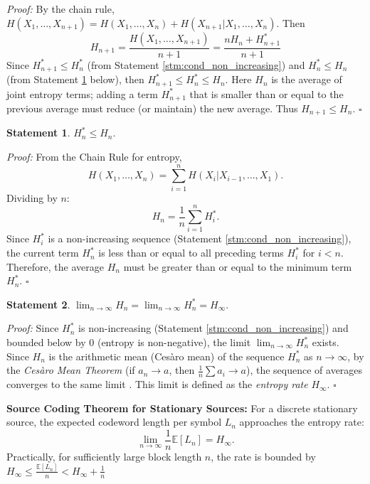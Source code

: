 \documentclass[11pt,a4paper]{article}
\theoremstyle{definition} %
\newtheorem{statement}{Statement}
\newcommand{\E}{\mathbb{E}}
\newcommand{\Hrate}{H_\infty}
\begin{document}
\textit{Proof:} By the chain rule, $H(X_1, \dots, X_{n+1}) = H(X_1, \dots, X_n) + H(X_{n+1} | X_1, \dots, X_n)$. Then
\begin{equation}
    H_{n+1} = \frac{H(X_1, \dots, X_{n+1})}{n+1} = \frac{n H_n + H_{n+1}^*}{n+1}
\end{equation}
Since $H_{n+1}^* \le H_n^*$ (from Statement \ref{stm:cond_non_increasing}) and $H_n^* \le H_n$ (from Statement \ref{stm:bound_relation} below), then $H_{n+1}^* \le H_n^* \le H_n$. Here $H_n$ is the average of joint entropy terms; adding a term $H_{n+1}^*$ that is smaller than or equal to the previous average must reduce (or maintain) the new average. Thus $H_{n+1} \le H_n$. $\square$

\begin{statement} \label{stm:bound_relation}
    $H_n^* \le H_n$.
\end{statement}

\textit{Proof:} From the Chain Rule for entropy,
\begin{equation}
    H(X_1, \dots, X_n) = \sum_{i=1}^n H(X_i | X_{i-1}, \dots, X_1).
\end{equation}
Dividing by $n$:
\begin{equation}
    H_n = \frac{1}{n} \sum_{i=1}^n H_i^*.
\end{equation}
Since $H_i^*$ is a non-increasing sequence (Statement \ref{stm:cond_non_increasing}), the current term $H_n^*$ is less than or equal to all preceding terms $H_i^*$ for $i < n$. Therefore, the average $H_n$ must be greater than or equal to the minimum term $H_n^*$. $\square$

\begin{statement} \label{stm:convergence}
    $\lim_{n \to \infty} H_n = \lim_{n \to \infty} H_n^* = \Hrate$.
\end{statement}

\textit{Proof:} Since $H_n^*$ is non-increasing (Statement \ref{stm:cond_non_increasing}) and bounded below by 0 (entropy is non-negative), the limit $\lim_{n \to \infty} H_n^* $ exists. Since $H_n$ is the arithmetic mean (Cesàro mean) of the sequence $H_n^*$ as $n \to \infty$, by the \textit{Cesàro Mean Theorem} (if $a_n \to a$, then $\frac{1}{n}\sum a_i \to a$), the sequence of averages converges to the same limit \cite[Thm 4.2.1]{cover}. This limit is defined as the \textit{entropy rate} $\Hrate$. $\square$

\textbf{Source Coding Theorem for Stationary Sources:} For a discrete stationary source, the expected codeword length per symbol $L_n$ approaches the entropy rate:
\begin{equation}
    \lim_{n \to \infty} \frac{1}{n} \E[L_n] = \Hrate.
\end{equation}
Practically, for sufficiently large block length $n$, the rate is bounded by $\Hrate \le \frac{\E[L_n]}{n} < \Hrate + \frac{1}{n}$
\end{document}
